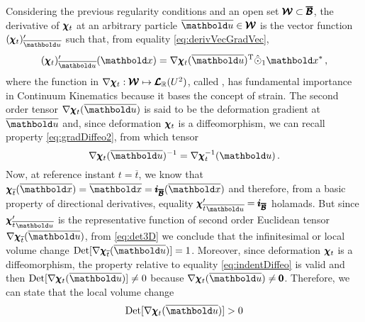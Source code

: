 Considering the previous regularity conditions and an open set $\pmb{\mathcal{W}}\subset\pmb{\overline{\mathcal{B}}}$, the derivative of $\pmb{\chi}_t$ at an arbitrary particle $\overline{\vto{u}}\in\pmb{\mathcal{W}}$ is the vector function $(\tnr{\chi}_t)'_{\overline{\vto{u}}}$ such that, from equality \eqref{eq:derivVecGradVec}, 
\begin{equation}
\fua{(\tnr{\chi}_t)'_{\overline{\vto{u}}}}{\vto{x}}= \fua{ \nabla\tnr{\chi}_t}{\overline{\vto{u}}}^{\text{T}}\hat{\odot}_1\vto{x}^*\,,
\end{equation}
where the function in $\nabla\pmb{\chi}_t : \pmb{\mathcal{W}} \mapsto \pmb{\mathcal{L}}_{\mathbb{R}}(U^{2})$, called , has fundamental importance in Continuum Kinematics because it bases the concept of strain. The second order tensor $\fua{ \nabla\tnr{\chi}_t}{\overline{\vto{u}}}$ is said to be the deformation gradient at $\overline{\vto{u}}$ and, since deformation $\pmb{\chi}_t$ is a diffeomorphism, we can recall property \eqref{eq:gradDiffeo2}, from which tensor
\begin{equation}\label{eq:invGradDef}
\fua{\nabla\tnr{\chi}_t}{\overline{\vto{u}}}^{-1} = \fua{\nabla\tnr{\chi}_t^{-1}}{\vto{u}}\,.
\end{equation}
Now, at reference instant $t=\overline{t}$, we know that $\tnr{\chi}_{\overline{t}}(\overline{\vto{x}})=\overline{\vto{x}}=\tnr{i}_{\tnr{\overline{\mathcal{B}}}}(\overline{\vto{x}})$ and therefore, from a basic property of directional derivatives, equality ${\tnr{\chi}'_{\overline{t}} }_{\overline{\vto{u}}}=\tnr{i}_{\tnr{\overline{\mathcal{B}}}}$ holamads. But since ${\tnr{\chi}'_{\overline{t}} }_{\overline{\vto{u}}}$ is the representative function of second order Euclidean tensor $\fua{\nabla\tnr{\chi}_{\overline{t}}}{\overline{\vto{u}}}$, from \eqref{eq:det3D} we conclude that the infinitesimal or local volume change $\textnormal{Det}[\fua{\nabla\tnr{\chi}_{\overline{t}}}{\overline{\vto{u}}}]=1$. Moreover, since deformation $\pmb{\chi}_{t}$ is a diffeomorphism, the property relative to equality \eqref{eq:indentDiffeo} is valid and then $\textnormal{Det}[\fua{\nabla\tnr{\chi}_{t}}{\overline{\vto{u}}}]\neq 0$ because $\fua{\nabla\tnr{\chi}_{t}}{\overline{\vto{u}}}\neq \tnr{0}$. Therefore, we can state that the local volume change       
\begin{equation}\label{eq:detPositive}
\textnormal{Det}[\fua{\nabla\tnr{\chi}_t}{\overline{\vto{u}}}]>0
\end{equation}
